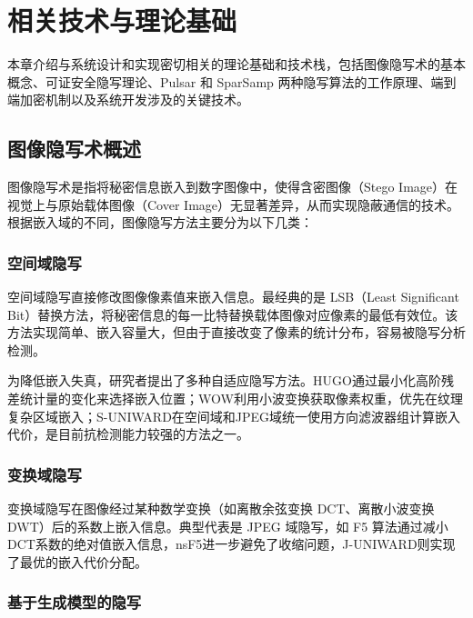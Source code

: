 \section{相关技术与理论基础}\label{chap:theory}

本章介绍与系统设计和实现密切相关的理论基础和技术栈，包括图像隐写术的基本概念、可证安全隐写理论、Pulsar 和 SparSamp 两种隐写算法的工作原理、端到端加密机制以及系统开发涉及的关键技术。

\subsection{图像隐写术概述}

图像隐写术是指将秘密信息嵌入到数字图像中，使得含密图像（Stego Image）在视觉上与原始载体图像（Cover Image）无显著差异，从而实现隐蔽通信的技术\supercite{fridrich2009steganography}。根据嵌入域的不同，图像隐写方法主要分为以下几类：

\subsubsection{空间域隐写}

空间域隐写直接修改图像像素值来嵌入信息。最经典的是 LSB（Least Significant Bit）替换方法，将秘密信息的每一比特替换载体图像对应像素的最低有效位\supercite{chan2004hiding}。该方法实现简单、嵌入容量大，但由于直接改变了像素的统计分布，容易被隐写分析检测。

为降低嵌入失真，研究者提出了多种自适应隐写方法。HUGO\supercite{pevny2010using}通过最小化高阶残差统计量的变化来选择嵌入位置；WOW\supercite{holub2012designing}利用小波变换获取像素权重，优先在纹理复杂区域嵌入；S-UNIWARD\supercite{holub2014universal}在空间域和JPEG域统一使用方向滤波器组计算嵌入代价，是目前抗检测能力较强的方法之一。

\subsubsection{变换域隐写}

变换域隐写在图像经过某种数学变换（如离散余弦变换 DCT、离散小波变换 DWT）后的系数上嵌入信息。典型代表是 JPEG 域隐写，如 F5 算法\supercite{westfeld2001f5}通过减小DCT系数的绝对值嵌入信息，nsF5\supercite{fridrich2007statistically}进一步避免了收缩问题，J-UNIWARD\supercite{holub2014universal}则实现了最优的嵌入代价分配。

\subsubsection{基于生成模型的隐写}

